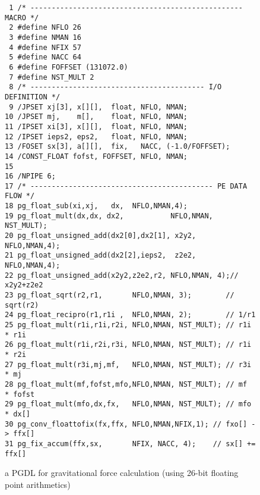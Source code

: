 \documentclass[times, 10pt,twocolumn]{article}
\begin{document}
\begin{figure}
\scriptsize
{\tiny
\begin{verbatim}
 1 /* -------------------------------------------------- MACRO */
 2 #define NFLO 26
 3 #define NMAN 16
 4 #define NFIX 57
 5 #define NACC 64
 6 #define FOFFSET (131072.0)
 7 #define NST_MULT 2
 8 /* ----------------------------------------- I/O DEFINITION */
 9 /JPSET xj[3], x[][],  float, NFLO, NMAN;
10 /JPSET mj,    m[],    float, NFLO, NMAN;
11 /IPSET xi[3], x[][],  float, NFLO, NMAN;
12 /IPSET ieps2, eps2,   float, NFLO, NMAN;
13 /FOSET sx[3], a[][],  fix,   NACC, (-1.0/FOFFSET);
14 /CONST_FLOAT fofst, FOFFSET, NFLO, NMAN;
15
16 /NPIPE 6;
17 /* ------------------------------------------- PE DATA FLOW */
18 pg_float_sub(xi,xj,   dx,  NFLO,NMAN,4);
19 pg_float_mult(dx,dx, dx2,           NFLO,NMAN, NST_MULT);
20 pg_float_unsigned_add(dx2[0],dx2[1], x2y2,  NFLO,NMAN,4);
21 pg_float_unsigned_add(dx2[2],ieps2,  z2e2,  NFLO,NMAN,4);
22 pg_float_unsigned_add(x2y2,z2e2,r2, NFLO,NMAN, 4);// x2y2+z2e2
23 pg_float_sqrt(r2,r1,       NFLO,NMAN, 3);        // sqrt(r2)
24 pg_float_recipro(r1,r1i ,  NFLO,NMAN, 2);        // 1/r1
25 pg_float_mult(r1i,r1i,r2i, NFLO,NMAN, NST_MULT); // r1i * r1i
26 pg_float_mult(r1i,r2i,r3i, NFLO,NMAN, NST_MULT); // r1i * r2i
27 pg_float_mult(r3i,mj,mf,   NFLO,NMAN, NST_MULT); // r3i * mj
28 pg_float_mult(mf,fofst,mfo,NFLO,NMAN, NST_MULT); // mf  * fofst
29 pg_float_mult(mfo,dx,fx,   NFLO,NMAN, NST_MULT); // mfo * dx[]
30 pg_conv_floattofix(fx,ffx, NFLO,NMAN,NFIX,1); // fxo[] -> ffx[]
31 pg_fix_accum(ffx,sx,       NFIX, NACC, 4);    // sx[] += ffx[]
\end{verbatim}
}
\caption{a PGDL for gravitational force calculation (using 26-bit floating point arithmetics)}
\label{figgravfloat_pgdl}
\end{figure}
\end{document}
